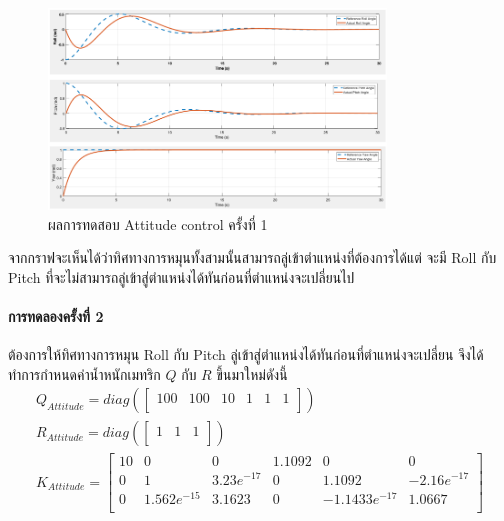 \begin{figure}[!ht]
	\centering
	\includegraphics[width=0.8\textwidth]{images/simulink/attitude_control1.png}
	\caption{ผลการทดสอบ Attitude control ครั้งที่ 1}
\end{figure}

จากกราฟจะเห็นได้ว่าทิศทางการหมุนทั้งสามนั้นสามารถลู่เข้าตำแหน่งที่ต้องการได้แต่ จะมี Roll กับ Pitch ที่จะไม่สามารถลู่เข้าสู่ตำแหน่งได้ทันก่อนที่ตำแหน่งจะเปลี่ยนไป

\clearpage
\paragraph*{การทดลองครั้งที่ 2}
ต้องการให้ทิศทางการหมุน Roll กับ Pitch ลู่เข้าสู่ตำแหน่งได้ทันก่อนที่ตำแหน่งจะเปลี่ยน จึงได้ทำการกำหนดค่าน้ำหนักเมทริก $Q$ กับ $R$ ขึ้นมาใหม่ดังนี้
\begin{equation}
    \begin{array}{c}
    {Q_{Attitude}=diag(\begin{bmatrix}
        100 & 100 & 10 & 1 & 1 & 1\\
    \end{bmatrix})}\\[10pt]
    {R_{Attitude} = diag(\begin{bmatrix}
        1 & 1 & 1\\
    \end{bmatrix})}\\[10pt]
    {K_{Attitude} = \begin{bmatrix}
        10 & 0 & 0 & 1.1092 & 0 & 0 \\
        0 & 1 & 3.23e^{-17} & 0 & 1.1092 & -2.16e^{-17} \\
        0 & 1.562e^{-15} & 3.1623 & 0 & -1.1433e^{-17} & 1.0667 \\
    \end{bmatrix}} \\[10pt]
    \end{array}
\end{equation}

